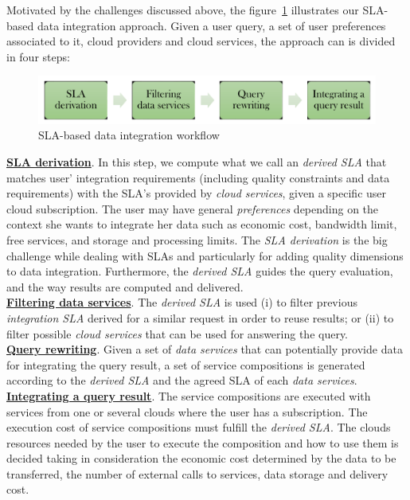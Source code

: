 Motivated by the challenges discussed above, the figure~\ref{fig:workflow} illustrates our SLA-based data integration approach. Given a user query, a set of user preferences associated to it, cloud providers and cloud services, the approach can is divided in four steps:

\begin{figure}[h!]
\center
\includegraphics[scale=0.50]{workflow-approach.pdf}
\caption{SLA-based data integration workflow}\label{fig:workflow}
\end{figure}

\noindent \textbf{\underline{SLA derivation}}. In this step, we compute what we call an \textsl{derived SLA} that matches user' integration requirements (including quality constraints and data requirements) with the SLA's provided by \textit{cloud services}, given a specific user cloud subscription. The user may have general \textit{preferences} depending on the context she wants to integrate her data such as economic cost, bandwidth limit, free services, and storage and processing limits. The \textit{SLA derivation} is the big challenge while dealing with SLAs and particularly for adding quality dimensions to data integration. Furthermore, the \textsl{derived SLA} guides the query evaluation, and the way results are computed and delivered. \\
\textbf{\underline{Filtering data services}}. The \textsl{derived SLA} is used (i)
to filter previous \textsl{integration SLA} derived for a similar request in order to reuse results; or (ii) to filter possible \textit{cloud services} that can be used for answering the query. \\ %
\textbf{\underline{Query rewriting}}. Given a set of \textit{data services} that can
potentially provide data for integrating the query result, a set of service compositions is generated according to the \textsl{derived SLA} and the agreed SLA of each \textit{data services}. \\
\textbf{\underline{Integrating a query result}}. The service compositions are
executed with services from one or several clouds where the user has a
subscription.
The execution cost of service compositions must fulfill the \textsl{derived
SLA}. The clouds resources needed by the user to execute the composition and how
to use them is decided taking in consideration the economic cost determined by
the data to be transferred, the number of external calls to services, data storage and delivery cost.

